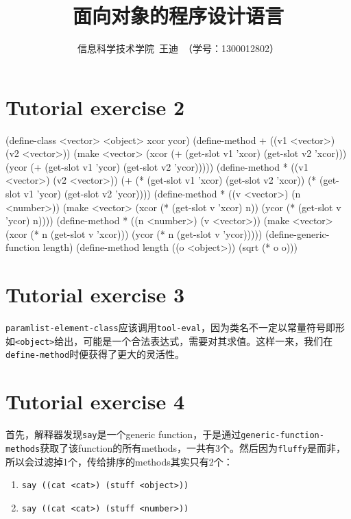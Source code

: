 \documentclass[a4paper]{article}
\author{{信息科学技术学院~王迪~（学号：1300012802）}}
\newcommand{\code}[1]{\mbox{\tt #1}}
\begin{document}
\title{面向对象的程序设计语言}
\maketitle

\tableofcontents

\newpage

\section{Tutorial exercise 2}

\beginlisp
(define-class <vector> <object> xcor ycor)
\null
(define-method + ((v1 <vector>) (v2 <vector>))
  (make <vector> (xcor (+ (get-slot v1 'xcor)
                          (get-slot v2 'xcor)))
                 (ycor (+ (get-slot v1 'ycor)
                          (get-slot v2 'ycor)))))
\null
(define-method * ((v1 <vector>) (v2 <vector>))
  (+ (* (get-slot v1 'xcor) 
        (get-slot v2 'xcor)) 
     (* (get-slot v1 'ycor) 
        (get-slot v2 'ycor))))
\null
(define-method * ((v <vector>) (n <number>))
  (make <vector> (xcor (* (get-slot v 'xcor)
                          n))
                 (ycor (* (get-slot v 'ycor)
                          n))))
(define-method * ((n <number>) (v <vector>))
  (make <vector> (xcor (* n
                          (get-slot v 'xcor)))
                 (ycor (* n
                          (get-slot v 'ycor)))))
\null
(define-generic-function length)
(define-method length ((o <object>))
  (sqrt (* o o)))
\endlisp

\section{Tutorial exercise 3}

\code{paramlist-element-class}应该调用\code{tool-eval}，因为类名不一定以常量符号即形如\code{<object>}给出，可能是一个合法表达式，需要对其求值。这样一来，我们在\code{define-method}时便获得了更大的灵活性。

\section{Tutorial exercise 4}

首先，解释器发现\code{say}是一个generic function，于是通过\code{generic-function-methods}获取了该function的所有methods，一共有3个。然后因为\code{fluffy}是\code{<house-cat>}而非\code{<show-cat>}，所以会过滤掉1个，传给排序的methods其实只有2个：

\begin{enumerate}
    \item \code{say ((cat <cat>) (stuff <object>))}
    \item \code{say ((cat <cat>) (stuff <number>))}
\end{enumerate}
\end{document}
